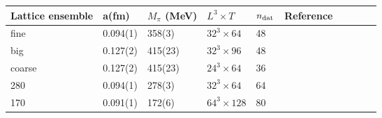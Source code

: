 \begin{tabularx}{\textwidth}{XXXXXccccc}
    \toprule
     Lattice ensemble        &     a(fm)  &   $M_{\pi}$ (MeV)   &  $L^3 \times T$ & $n_{\rm dat}$ & Reference   \\
    \midrule
     fine                         &  0.094(1)  &  358(3)  &  $32^3\times 64$ &       48  &    \\
     big                      &  0.127(2)  &  415(23)  &  $32^3\times 96$ &       48   &  \cite{Joo:2019jct,Joo:2020spy}  \\
     coarse                      &  0.127(2)  &  415(23)  &  $24^3\times 64$ &       36   &   \\
     \midrule
     280                        &  0.094(1)  &  278(3)   &  $32^3\times 64$ &       64    &  \cite{Joo:2020spy}  \\
     170                         & 0.091(1)  &  172(6)   &  $64^3\times 128$&       80   &   \\
    \bottomrule
    \end{tabularx}
    
